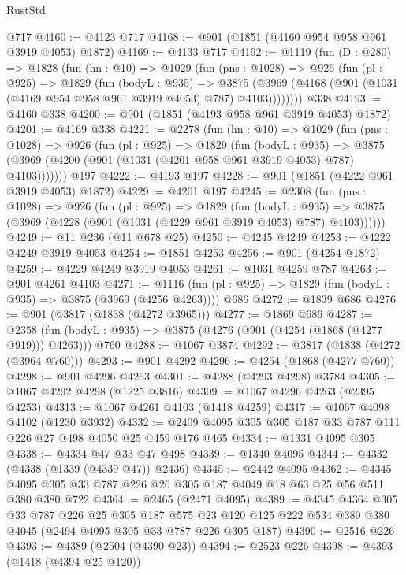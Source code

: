 \begin{lexlean}{RustStd}
\begin{coremodule}
{\begin{coremodule}
{{{{{{{{{{{{{{    @717
@4160 := @4123 @717
@4168 := @901 (@1851 (@4160 @954 @958 @961 @3919 @4053) @1872)
@4169 := @4133 @717
@4192 := @1119
    (fun (D : @280) =>
    @1828
      (fun (hn : @10) =>
      @1029
        (fun (pns : @1028) =>
        @926
          (fun (pl : @925) =>
          @1829
            (fun (bodyL : @935) =>
            @3875 (@3969 (@4168 (@901 (@1031 (@4169 @954 @958 @961 @3919 @4053) @787) @4103))))))))
    @338
@4193 := @4160 @338
@4200 := @901 (@1851 (@4193 @958 @961 @3919 @4053) @1872)
@4201 := @4169 @338
@4221 := @2278
    (fun (hn : @10) =>
    @1029
      (fun (pns : @1028) =>
      @926
        (fun (pl : @925) =>
        @1829
          (fun (bodyL : @935) =>
          @3875 (@3969 (@4200 (@901 (@1031 (@4201 @958 @961 @3919 @4053) @787) @4103)))))))
    @197
@4222 := @4193 @197
@4228 := @901 (@1851 (@4222 @961 @3919 @4053) @1872)
@4229 := @4201 @197
@4245 := @2308
    (fun (pns : @1028) =>
    @926
      (fun (pl : @925) =>
      @1829
        (fun (bodyL : @935) =>
        @3875 (@3969 (@4228 (@901 (@1031 (@4229 @961 @3919 @4053) @787) @4103))))))
@4249 := @11 @236 (@11 @678 @25)
@4250 := @4245 @4249
@4253 := @4222 @4249 @3919 @4053
@4254 := @1851 @4253
@4256 := @901 (@4254 @1872)
@4259 := @4229 @4249 @3919 @4053
@4261 := @1031 @4259 @787
@4263 := @901 @4261 @4103
@4271 := @1116 (fun (pl : @925) => @1829 (fun (bodyL : @935) => @3875 (@3969 (@4256 @4263)))) @686
@4272 := @1839 @686
@4276 := @901 (@3817 (@1838 (@4272 @3965)))
@4277 := @1869 @686
@4287 := @2358 (fun (bodyL : @935) => @3875 (@4276 (@901 (@4254 (@1868 (@4277 @919))) @4263))) @760
@4288 := @1067 @3874
@4292 := @3817 (@1838 (@4272 (@3964 @760)))
@4293 := @901 @4292
@4296 := @4254 (@1868 (@4277 @760))
@4298 := @901 @4296 @4263
@4301 := @4288 (@4293 @4298) @3784
@4305 := @1067 @4292 @4298 (@1225 @3816)
@4309 := @1067 @4296 @4263 (@2395 @4253)
@4313 := @1067 @4261 @4103 (@1418 @4259)
@4317 := @1067 @4098 @4102 (@1230 @3932)
@4332 := @2409 @4095 @305 @305 @187 @33 @787 @111 @226 @27 @498 @4050 @25 @459 @176 @465
@4334 := @1331 @4095 @305
@4338 := @4334 @47 @33 @47 @498
@4339 := @1340 @4095
@4344 := @4332 (@4338 (@1339 (@4339 @47)) @2436)
@4345 := @2442 @4095
@4362 := @4345 @4095 @305 @33 @787 @226 @26 @305 @187 @4049 @18 @63 @25 @56 @511 @380 @380 @722
@4364 := @2465 (@2471 @4095)
@4389 := @4345
    @4364
    @305
    @33
    @787
    @226
    @25
    @305
    @187
    @575
    @23
    @120
    @125
    @222
    @534
    @380
    @380
    @4045
    (@2494 @4095 @305 @33 @787 @226 @305 @187)
@4390 := @2516 @226
@4393 := @4389 (@2504 (@4390 @23))
@4394 := @2523 @226
@4398 := @4393 (@1418 (@4394 @25 @120))
}}}}}}}}}}}}}}
\end{coremodule}}
\end{coremodule}
\end{lexlean}
